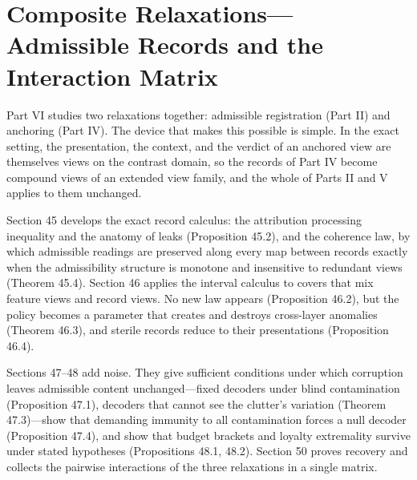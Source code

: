 \part{Composite Relaxations---\hspace{0pt}Admissible Records and the
Interaction Matrix}


Part VI studies two relaxations together: admissible registration (Part II) and anchoring (Part IV). The device that makes this possible is simple. In the exact setting, the presentation, the context, and the verdict of an anchored view are themselves views on the contrast domain, so the records of Part IV become compound views of an extended view family, and the whole of Parts II and V applies to them unchanged.

Section 45 develops the exact record calculus: the attribution processing inequality and the anatomy of leaks (Proposition 45.2), and the coherence law, by which admissible readings are preserved along every map between records exactly when the admissibility structure is monotone and insensitive to redundant views (Theorem 45.4). Section 46 applies the interval calculus to covers that mix feature views and record views. No new law appears (Proposition 46.2), but the policy becomes a parameter that creates and destroys cross-layer anomalies (Theorem 46.3), and sterile records reduce to their presentations (Proposition 46.4).

Sections 47--48 add noise. They give sufficient conditions under which corruption leaves admissible content unchanged---\hspace{0pt}fixed decoders under blind contamination (Proposition 47.1), decoders that cannot see the clutter's variation (Theorem 47.3)---\hspace{0pt}show that demanding immunity to all contamination forces a null decoder (Proposition 47.4), and show that budget brackets and loyalty extremality survive under stated hypotheses (Propositions 48.1, 48.2). Section 50 proves recovery and collects the pairwise interactions of the three relaxations in a single matrix.



